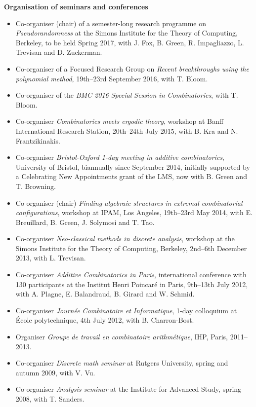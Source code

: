 \documentclass[11pt]{article}
\newenvironment{mitemize}{
\begin{itemize}
  \setlength{\itemsep}{1pt}
  \setlength{\parskip}{0pt}
  \setlength{\parsep}{0pt}
}{\end{itemize}}
\begin{document}
\vspace{3pt}
\textbf{Organisation of seminars and conferences}
\begin{mitemize}
\item Co-organiser (chair) of a semester-long research programme on \emph{Pseudorandomness} at the Simons Institute for the Theory of Computing, Berkeley, to be held Spring 2017, with J. Fox, B. Green, R. Impagliazzo, L. Trevisan and D. Zuckerman.
\item Co-organiser of a Focused Research Group on \emph{Recent breakthroughs using the polynomial method}, 19th--23rd September 2016, with T. Bloom.
\item Co-organiser of the \emph{BMC 2016 Special Session in Combinatorics}, with T. Bloom.
\item Co-organiser \emph{Combinatorics meets ergodic theory}, workshop at Banff International Research Station, 20th--24th July 2015, with B. Kra and N. Frantzikinakis.
\item Co-organiser \emph{Bristol-Oxford 1-day meeting in additive combinatorics}, University of Bristol, biannually since September 2014, initially supported by a Celebrating New Appointments grant of the LMS, now with B. Green and T. Browning.
\item Co-organiser (chair) \emph{Finding algebraic structures in extremal combinatorial configurations}, workshop at IPAM, Los Angeles, 19th--23rd May 2014, with E. Breuillard, B. Green, J. Solymosi and T. Tao.
\item Co-organiser \textit{Neo-classical methods in discrete analysis}, workshop at the Simons Institute for the Theory of Computing, Berkeley, 2nd--6th December 2013, with L. Trevisan.
\item Co-organiser \textit{Additive Combinatorics in Paris}, international conference with 130 participants at the Institut Henri Poincar\'e in Paris, 9th--13th July 2012, with A. Plagne, E. Balandraud, B. Girard and W. Schmid. 
\item Co-organiser \textit{Journ\'ee Combinatoire et Informatique}, 1-day colloquium at \'Ecole polytechnique, 4th July 2012, with B. Charron-Bost.
\item Organiser \textit{Groupe de travail en combinatoire arithm\'etique}, IHP, Paris, 2011--2013.
\item Co-organiser \textit{Discrete math seminar} at Rutgers University, spring and autumn 2009, with V. Vu.
\item Co-organiser \textit{Analysis seminar} at the Institute for Advanced Study, spring 2008, with T. Sanders.
\end{mitemize}
\end{document}
